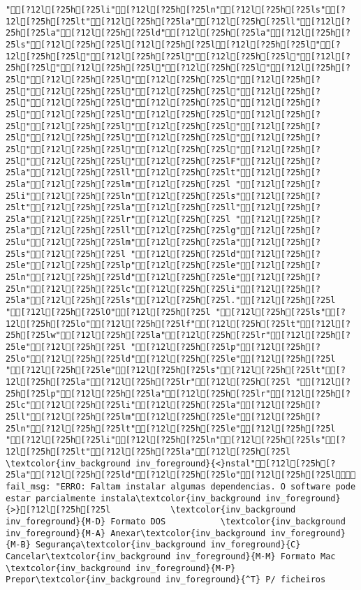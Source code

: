 \documentclass{scrartcl}
\begin{document}
\begin{Verbatim}
"[?12l[?25h[?25li"[?12l[?25h[?25ln"[?12l[?25h[?25ls"[?12l[?25h[?25lt"[?12l[?25h[?25la"[?12l[?25h[?25ll"[?12l[?25h[?25la"[?12l[?25h[?25ld"[?12l[?25h[?25la"[?12l[?25h[?25ls"[?12l[?25h[?25l[?12l[?25h[?25l[?12l[?25h[?25l"[?12l[?25h[?25l"[?12l[?25h[?25l"[?12l[?25h[?25l"[?12l[?25h[?25l"[?12l[?25h[?25l"[?12l[?25h[?25l"[?12l[?25h[?25l"[?12l[?25h[?25l"[?12l[?25h[?25l"[?12l[?25h[?25l"[?12l[?25h[?25l"[?12l[?25h[?25l"[?12l[?25h[?25l"[?12l[?25h[?25l"[?12l[?25h[?25l"[?12l[?25h[?25l"[?12l[?25h[?25l"[?12l[?25h[?25l"[?12l[?25h[?25l"[?12l[?25h[?25l"[?12l[?25h[?25l"[?12l[?25h[?25l"[?12l[?25h[?25l"[?12l[?25h[?25l"[?12l[?25h[?25l"[?12l[?25h[?25l"[?12l[?25h[?25l"[?12l[?25h[?25l"[?12l[?25h[?25l"[?12l[?25h[?25lF"[?12l[?25h[?25la"[?12l[?25h[?25ll"[?12l[?25h[?25lt"[?12l[?25h[?25la"[?12l[?25h[?25lm"[?12l[?25h[?25l "[?12l[?25h[?25li"[?12l[?25h[?25ln"[?12l[?25h[?25ls"[?12l[?25h[?25lt"[?12l[?25h[?25la"[?12l[?25h[?25ll"[?12l[?25h[?25la"[?12l[?25h[?25lr"[?12l[?25h[?25l "[?12l[?25h[?25la"[?12l[?25h[?25ll"[?12l[?25h[?25lg"[?12l[?25h[?25lu"[?12l[?25h[?25lm"[?12l[?25h[?25la"[?12l[?25h[?25ls"[?12l[?25h[?25l "[?12l[?25h[?25ld"[?12l[?25h[?25le"[?12l[?25h[?25lp"[?12l[?25h[?25le"[?12l[?25h[?25ln"[?12l[?25h[?25ld"[?12l[?25h[?25le"[?12l[?25h[?25ln"[?12l[?25h[?25lc"[?12l[?25h[?25li"[?12l[?25h[?25la"[?12l[?25h[?25ls"[?12l[?25h[?25l."[?12l[?25h[?25l "[?12l[?25h[?25lO"[?12l[?25h[?25l "[?12l[?25h[?25ls"[?12l[?25h[?25lo"[?12l[?25h[?25lf"[?12l[?25h[?25lt"[?12l[?25h[?25lw"[?12l[?25h[?25la"[?12l[?25h[?25lr"[?12l[?25h[?25le"[?12l[?25h[?25l "[?12l[?25h[?25lp"[?12l[?25h[?25lo"[?12l[?25h[?25ld"[?12l[?25h[?25le"[?12l[?25h[?25l "[?12l[?25h[?25le"[?12l[?25h[?25ls"[?12l[?25h[?25lt"[?12l[?25h[?25la"[?12l[?25h[?25lr"[?12l[?25h[?25l "[?12l[?25h[?25lp"[?12l[?25h[?25la"[?12l[?25h[?25lr"[?12l[?25h[?25lc"[?12l[?25h[?25li"[?12l[?25h[?25la"[?12l[?25h[?25ll"[?12l[?25h[?25lm"[?12l[?25h[?25le"[?12l[?25h[?25ln"[?12l[?25h[?25lt"[?12l[?25h[?25le"[?12l[?25h[?25l "[?12l[?25h[?25li"[?12l[?25h[?25ln"[?12l[?25h[?25ls"[?12l[?25h[?25lt"[?12l[?25h[?25la"[?12l[?25h[?25l
\textcolor{inv_background inv_foreground}{<}nstal"[?12l[?25h[?25la"[?12l[?25h[?25ld"[?12l[?25h[?25lo"[?12l[?25h[?25l fail_msg: "ERRO: Faltam instalar algumas dependencias. O software pode estar parcialmente instala\textcolor{inv_background inv_foreground}{>}[?12l[?25h[?25l            \textcolor{inv_background inv_foreground}{M-D} Formato DOS           \textcolor{inv_background inv_foreground}{M-A} Anexar\textcolor{inv_background inv_foreground}{M-B} Segurança\textcolor{inv_background inv_foreground}{C} Cancelar\textcolor{inv_background inv_foreground}{M-M} Formato Mac           \textcolor{inv_background inv_foreground}{M-P} Prepor\textcolor{inv_background inv_foreground}{^T} P/ ficheiros

\end{Verbatim}
\end{document}

